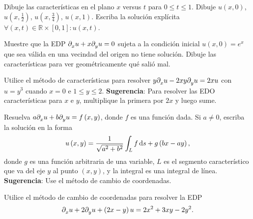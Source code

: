 Dibuje las características en el plano $x$ versus $t$ para
$0\leq t\leq 1$.
Dibuje $u\left(x,0\right)$, $u\left(x,\frac{1}{2}\right)$,
$u\left(x,\frac{3}{4}\right)$, $u\left(x,1\right)$.
Escriba la solución explícita
\begin{math}
	\forall\left(x,t\right)\in
	\mathbb{R}\times\left[0,1\right]:
	u\left(x,t\right)
\end{math}.

\question

Muestre que la EDP
$\difcp{u}{x}+x\difcp{u}{y}=0$ sujeta a la condición inicial
$u\left(x,0\right)=e^{x}$ que sea válida en una vecindad del origen
no tiene solución.
Dibuje las características para ver geométricamente qué salió mal.

\question

Utilice el método de características para resolver
\begin{math}
	y\difcp{u}{x}-
	2xy\difcp{u}{y}=
	2xu
\end{math}
con $u=y^{3}$ cuando $x=0$ e $1\leq y\leq 2$.
\textbf{Sugerencia}: Para resolver las EDO características para $x$ e
$y$, multiplique la primera por $2x$ y luego sume.

\question

Resuelva $a\difcp{u}{x}+b\difcp{u}{y}=f\left(x,y\right)$, donde
$f$ es una función dada.
Si $a\neq0$, escriba la solución en la forma
\begin{equation*}
	u\left(x,y\right)=
	\frac{1}{\sqrt{a^{2}+b^{2}}}
	\int_{L}
	f\dl s+
	g\left(bx-ay\right),
\end{equation*}
donde $g$ es una función arbitraria de una variable, $L$ es el
segmento característico que va del eje $y$ al punto
$\left(x,y\right)$, y la integral es una integral de línea.
\textbf{Sugerencia}: Use el método de cambio de coordenadas.

\question

Utilice el método de cambio de coordenadas para resolver la EDP
\begin{equation*}
	\difcp{u}{x}+
	2\difcp{u}{y}+
	\left(2x-y\right)u=
	2x^{2}+
	3xy-
	2y^{2}.
\end{equation*}

\question

